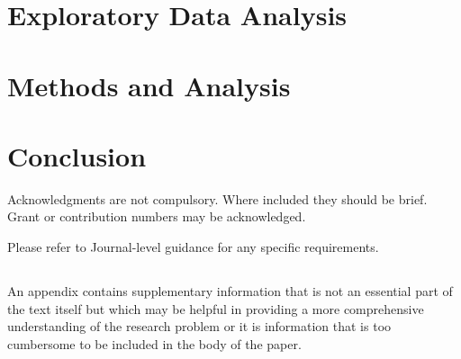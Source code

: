 \documentclass[sn-basic,pdflatex]{sn-jnl}
\theoremstyle{remark}
\theoremstyle{definition}
\begin{document}
\hypertarget{sec3}{%
\section{Exploratory Data Analysis}\label{sec3}}

\hypertarget{sec4}{%
\section{Methods and Analysis}\label{sec4}}

\hypertarget{sec5}{%
\section{Conclusion}\label{sec5}}


Acknowledgments are not compulsory. Where included they should be brief.
Grant or contribution numbers may be acknowledged.

Please refer to Journal-level guidance for any specific requirements.

\begin{appendices}

\hypertarget{secA}{%
\section{}\label{secA}}

An appendix contains supplementary information that is not an essential
part of the text itself but which may be helpful in providing a more
comprehensive understanding of the research problem or it is information
that is too cumbersome to be included in the body of the paper.

\end{appendices}


\end{document}
